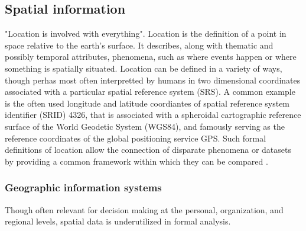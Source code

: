 \subsection{Spatial information}
"Location is involved with everything"\cite{Bhattacharya2018}. %
Location is the definition of a point in space relative to the earth's surface. It describes, along with thematic and possibly temporal attributes, phenomena, such as where events happen or where something is spatially situated\cite{Longely2005}. Location can be defined in a variety of ways, though perhas most often interpretted by humans in two dimensional coordinates associated with a particular spatial reference system (SRS). A common example is the often used longitude and latitude coordiantes of spatial reference system identifier (SRID) 4326, that is associated with a spheroidal cartographic reference surface of the World Geodetic System (WGS84), and famously serving as the reference coordinates of the global positioning service GPS\cite{dma91}. Such formal definitions of location allow the connection of disparate phenomena or datasets by providing a common framework within which they can be compared \cite{Bhattacharya2018}. %

\subsubsection{Geographic information systems}
Though often relevant for decision making at the personal, organization, and regional levels, spatial data is underutilized in formal analysis\cite{Bhattacharya2018}. %

